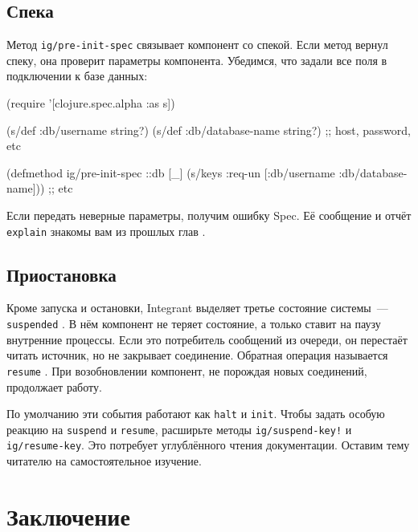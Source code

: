 \subsection{Спека}


Метод \verb|ig/pre-init-spec| связывает компонент со спекой. Если метод вернул
спеку, она проверит параметры компонента. Убедимся, что задали все поля в
подключении к базе данных:

\begin{english}
  \begin{clojure}
(require '[clojure.spec.alpha :as s])

(s/def :db/username string?)
(s/def :db/database-name string?)
;; host, password, etc

(defmethod ig/pre-init-spec ::db [_]
  (s/keys :req-un [:db/username
                   :db/database-name])) ;; etc
  \end{clojure}
\end{english}

\noindent
Если передать неверные параметры, получим ошибку Spec. Её сообщение и
отчёт \verb|explain| знакомы вам из прошлых глав .

\subsection{Приостановка}


Кроме запуска и остановки, Integrant выделяет третье состояние системы~---
\verb|suspended| . В нём компонент не теряет состояние, а
только ставит на паузу внутренние процессы. Если это потребитель сообщений из
очереди, он перестаёт читать источник, но не закрывает соединение. Обратная
операция называется \verb|resume| . При возобновлении
компонент, не порождая новых соединений, продолжает работу.

По умолчанию эти события работают как \verb|halt| и \verb|init|. Чтобы
задать особую реакцию на \verb|suspend| и \verb|resume|, расширьте методы
\verb|ig/suspend-key!| и \verb|ig/resume-key|. Это потребует углублённого
чтения документации. Оставим тему читателю на самостоятельное изучение.

\section{Заключение}

